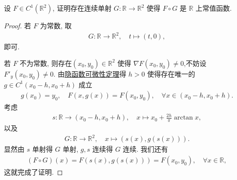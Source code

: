 \documentclass[../../main.tex]{subfiles}%
\begin{document}
\begin{example}
设 $F \in C^1(\mathbb{R}^2)$, 证明存在连续单射 $G:\mathbb{R}\to\mathbb{R}^2$ 使得 $F\circ G$ 是 $\mathbb{R}$ 上常值函数.
\end{example}
\begin{proof}

若 $F$ 为常数, 取
\begin{align*}
G:\mathbb{R}\to\mathbb{R}^2,\quad t\mapsto(t,0),
\end{align*}
即可.

若 $F$ 不为常数, 则存在$(x_0,y_0)\in\mathbb{R}^2$ 使得 $\nabla F(x_0,y_0)\neq 0$,不妨设 $F'_y(x_0,y_0)\neq 0$. 由\hyperref[theorem:隐函数可微性定理]{隐函数可微性定理}得 $h>0$ 使得存在唯一的 $g\in C^1(x_0-h,x_0+h)$ 成立
\begin{align*}
g(x_0)=y_0,\quad F(x,g(x))=F(x_0,y_0),\quad \forall x\in(x_0-h,x_0+h).
\end{align*}
考虑
\begin{align*}
s:\mathbb{R}\to(x_0-h,x_0+h),\quad x\mapsto x_0+\frac{2h}{\pi}\arctan x,
\end{align*}
以及
\begin{align*}
G:\mathbb{R}\to\mathbb{R}^2,\quad x\mapsto(s(x),g(s(x))).
\end{align*}
显然由 $s$ 单射得 $G$ 单射, $g,s$ 连续得 $G$ 连续. 我们还有
\begin{align*}
(F\circ G)(x)=F(s(x),g(s(x)))=F(x_0,y_0),\quad \forall x\in\mathbb{R},
\end{align*}
这就完成了证明.
\end{proof}
\end{document}
